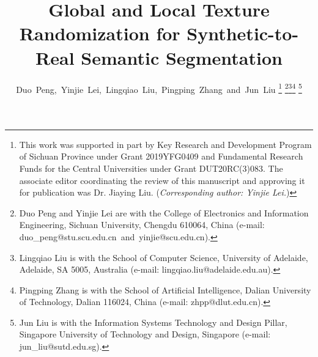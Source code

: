 \documentclass[twocolumn,journal,vlined,ruled,linesnumbered]{IEEEtran}
\begin{document}
\title{Global and Local Texture Randomization for Synthetic-to-Real Semantic
Segmentation}
\author{Duo~Peng,~Yinjie~Lei,~Lingqiao~Liu,~Pingping~Zhang~and~Jun~Liu
\thanks{This work was supported in part by Key Research and Development Program of Sichuan Province under Grant 2019YFG0409 and Fundamental Research Funds for the Central Universities under Grant DUT20RC(3)083. The associate editor coordinating the review of this manuscript and approving it for publication was Dr. Jiaying Liu. (\textit{Corresponding author: Yinjie Lei.})}
\thanks{Duo Peng and Yinjie Lei are with the College of Electronics and Information Engineering, Sichuan University, Chengdu 610064, China (e-mail: duo\_peng@stu.scu.edu.cn~and~yinjie@scu.edu.cn).}\thanks{Lingqiao Liu is with the School of Computer Science, University of Adelaide, Adelaide, SA 5005, Australia (e-mail: lingqiao.liu@adelaide.edu.au).}\thanks{Pingping Zhang is with the School of Artificial Intelligence, Dalian University of Technology, Dalian 116024, China (e-mail: zhpp@dlut.edu.cn).}
\thanks{Jun Liu is with the Information Systems Technology and Design Pillar, Singapore University of Technology and Design, Singapore (e-mail: jun\_liu@sutd.edu.sg).}}
\maketitle
\end{document}
